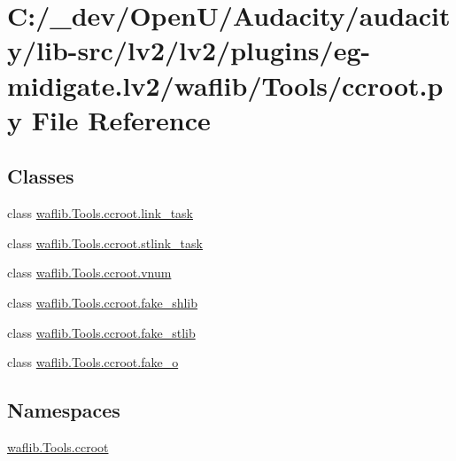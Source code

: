 \hypertarget{lv2_2plugins_2eg-midigate_8lv2_2waflib_2_tools_2ccroot_8py}{}\section{C\+:/\+\_\+dev/\+Open\+U/\+Audacity/audacity/lib-\/src/lv2/lv2/plugins/eg-\/midigate.lv2/waflib/\+Tools/ccroot.py File Reference}
\label{lv2_2plugins_2eg-midigate_8lv2_2waflib_2_tools_2ccroot_8py}
\subsection*{Classes}
\begin{DoxyCompactItemize}
\item 
class \hyperlink{classwaflib_1_1_tools_1_1ccroot_1_1link__task}{waflib.\+Tools.\+ccroot.\+link\+\_\+task}
\item 
class \hyperlink{classwaflib_1_1_tools_1_1ccroot_1_1stlink__task}{waflib.\+Tools.\+ccroot.\+stlink\+\_\+task}
\item 
class \hyperlink{classwaflib_1_1_tools_1_1ccroot_1_1vnum}{waflib.\+Tools.\+ccroot.\+vnum}
\item 
class \hyperlink{classwaflib_1_1_tools_1_1ccroot_1_1fake__shlib}{waflib.\+Tools.\+ccroot.\+fake\+\_\+shlib}
\item 
class \hyperlink{classwaflib_1_1_tools_1_1ccroot_1_1fake__stlib}{waflib.\+Tools.\+ccroot.\+fake\+\_\+stlib}
\item 
class \hyperlink{classwaflib_1_1_tools_1_1ccroot_1_1fake__o}{waflib.\+Tools.\+ccroot.\+fake\+\_\+o}
\end{DoxyCompactItemize}
\subsection*{Namespaces}
\begin{DoxyCompactItemize}
\item 
 \hyperlink{namespacewaflib_1_1_tools_1_1ccroot}{waflib.\+Tools.\+ccroot}
\end{DoxyCompactItemize}
